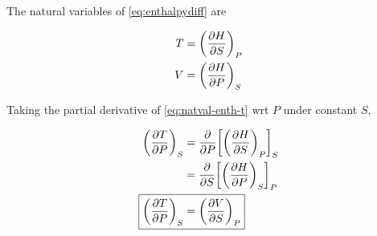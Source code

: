 \documentclass[12pt,a4paper,twocolumn]{article}
\begin{document}
The natural variables of \eqref{eq:enthalpydiff} are

\begin{align}
	T &= \qty(\pdv{H}{S})_P \label{eq:natval-enth-t} \\
	V &= \qty(\pdv{H}{P})_S \label{eq:natval-enth-v}
\end{align}

Taking the partial derivative of \eqref{eq:natval-enth-t} wrt $P$ under constant $S$,

\begin{align}
	\qty(\pdv{T}{P})_S &= \pdv{P}\qty[\qty(\pdv{H}{S})_P]_S \nonumber \\
	&= \pdv{S} \qty[\qty(\pdv{H}{P})_S]_P \nonumber \\
	\Aboxed{
		\qty(\pdv{T}{P})_S &= \qty(\pdv{V}{S})_P
	}
\end{align}
\end{document}
